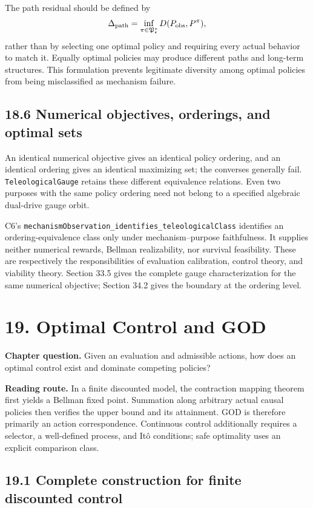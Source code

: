 \documentclass[
  english,
  11pt,
  oneside]{book}
\begin{document}
The path residual should be defined by \[\Delta_{\rm path}=
\inf_{\pi\in\mathfrak P^*_\epsilon}
D(P_{\rm obs},P^\pi),\] rather than by selecting one optimal policy and requiring every actual behavior to match it. Equally optimal policies may produce different paths and long-term structures. This formulation prevents legitimate diversity among optimal policies from being misclassified as mechanism failure.

\section{18.6 Numerical objectives, orderings, and optimal sets}\label{numerical-objectives-orderings-and-optimal-sets}

An identical numerical objective gives an identical policy ordering, and an identical ordering gives an identical maximizing set; the converses generally fail. \nolinkurl{TeleologicalGauge} retains these different equivalence relations. Even two purposes with the same policy ordering need not belong to a specified algebraic dual-drive gauge orbit.

C6's \nolinkurl{mechanismObservation_identifies_teleologicalClass} identifies an ordering-equivalence class only under mechanism--purpose faithfulness. It supplies neither numerical rewards, Bellman realizability, nor survival feasibility. These are respectively the responsibilities of evaluation calibration, control theory, and viability theory. Section 33.5 gives the complete gauge characterization for the same numerical objective; Section 34.2 gives the boundary at the ordering level.

\chapter{19. Optimal Control and GOD}\label{ch-19}

\textbf{Chapter question.} Given an evaluation and admissible actions, how does an optimal control exist and dominate competing policies?

\textbf{Reading route.} In a finite discounted model, the contraction mapping theorem first yields a Bellman fixed point. Summation along arbitrary actual causal policies then verifies the upper bound and its attainment. GOD is therefore primarily an action correspondence. Continuous control additionally requires a selector, a well-defined process, and Itô conditions; safe optimality uses an explicit comparison class.

\section{19.1 Complete construction for finite discounted control}\label{complete-construction-for-finite-discounted-control}
\end{document}
